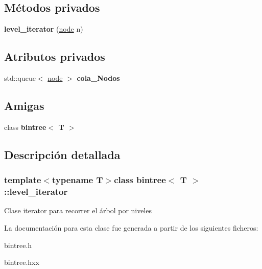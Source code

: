 \subsection*{Métodos privados}
\begin{DoxyCompactItemize}
\item 
\hypertarget{classbintree_1_1level__iterator_aa17a83ed28800006c4680d9a1381c56d}{}{\bfseries level\+\_\+iterator} (\hyperlink{classbintree_1_1node}{node} n)\label{classbintree_1_1level__iterator_aa17a83ed28800006c4680d9a1381c56d}

\end{DoxyCompactItemize}
\subsection*{Atributos privados}
\begin{DoxyCompactItemize}
\item 
\hypertarget{classbintree_1_1level__iterator_a41885b62709862eb21e5d854075ee3af}{}std\+::queue$<$ \hyperlink{classbintree_1_1node}{node} $>$ {\bfseries cola\+\_\+\+Nodos}\label{classbintree_1_1level__iterator_a41885b62709862eb21e5d854075ee3af}

\end{DoxyCompactItemize}
\subsection*{Amigas}
\begin{DoxyCompactItemize}
\item 
\hypertarget{classbintree_1_1level__iterator_a300e602ae13bd21fa092c5a5899e9eda}{}class {\bfseries bintree$<$ T $>$}\label{classbintree_1_1level__iterator_a300e602ae13bd21fa092c5a5899e9eda}

\end{DoxyCompactItemize}


\subsection{Descripción detallada}
\subsubsection*{template$<$typename T$>$class bintree$<$ T $>$\+::level\+\_\+iterator}

Clase iterator para recorrer el árbol por niveles 

La documentación para esta clase fue generada a partir de los siguientes ficheros\+:\begin{DoxyCompactItemize}
\item 
bintree.\+h\item 
bintree.\+hxx\end{DoxyCompactItemize}
